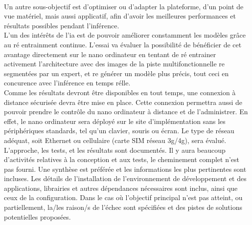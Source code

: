 \\
\noindent Un autre sous-objectif est d'optimiser ou d'adapter la plateforme, d'un point de vue matériel, mais aussi applicatif, afin d'avoir les meilleures performances et résultats possibles pendant l'inférence.
\vspace{\baselineskip}
\\
\noindent L'un des intérêts de l'\acrshort{ia} est de pouvoir améliorer constamment les modèles grâce au ré entrainment continue. L'essai va évaluer la possibilité de bénéficier de cet avantage directement sur le nano ordinateur en tentant de ré entrainer activement l'architecture avec des images de la piste multifonctionnelle re segmentées par un expert, et re générer un modèle plus précis, tout ceci en concurence avec l'inférence en temps rélle. 
\vspace{\baselineskip}
\\
\noindent Comme les résultats devront être disponibles en tout temps, une connexion à distance sécurisée devra être mise en place. Cette connexion permettra aussi de pouvoir prendre le contrôle du nano ordinateur à distance et de l'administrer. En effet, le nano ordinateur sera déployé sur le site d'implémentation sans les périphériques standards, tel qu'un clavier, souris ou écran. Le type de réseau adéquat, soit Ethernet ou cellulaire (carte SIM réseau 3g/4g), sera évalué.
\vspace{\baselineskip}
\\
\noindent L'approche, les tests, et les résultats sont documentés. Il y aura beaucoup d'activités relatives à la conception et aux tests, le cheminement complet n'est pas fourni. Une synthèse est préférée et les informations les plus pertinentes sont incluses. Les détails de l'installation de l'environnement de développement et des applications, librairies et autres dépendances nécessaires sont inclus, ainsi que ceux de la configuration. Dans le cas où l'objectif principal n'est pas atteint, ou partiellement, la/les raison/s de l'échec sont spécifiées et des pistes de solutions potentielles proposées.